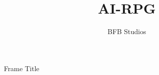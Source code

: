\documentclass{beamer}
\title{AI-RPG}
\author{BFB Studios}
\begin{document}
\begin{frame}[plain]
    \maketitle
\end{frame}
\begin{frame}{Frame Title}
\end{frame}
\end{document}
